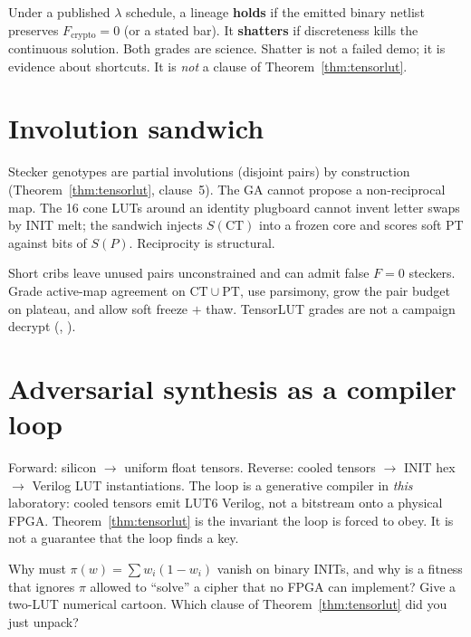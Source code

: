 \begin{definition}[Grade]
Under a published $\lambda$ schedule, a lineage \textbf{holds} if the
emitted binary netlist preserves $F_{\mathrm{crypto}}=0$ (or a stated
bar). It \textbf{shatters} if discreteness kills the continuous solution.
Both grades are science. Shatter is not a failed demo; it is evidence
about shortcuts. It is \emph{not} a clause of Theorem~\ref{thm:tensorlut}.
\end{definition}


\section{Involution sandwich}

Stecker genotypes are partial involutions (disjoint pairs) by construction
(Theorem~\ref{thm:tensorlut}, clause~5).
The GA cannot propose a non-reciprocal map.
The 16 cone LUTs around an identity plugboard cannot invent letter swaps by
INIT melt; the sandwich injects $S(\mathrm{CT})$ into a frozen core and
scores soft PT against bits of $S(P)$.
Reciprocity is structural.

\begin{warning}
Short cribs leave unused pairs unconstrained and can admit false $F=0$
steckers. Grade active-map agreement on $\mathrm{CT}\cup\mathrm{PT}$, use
parsimony, grow the pair budget on plateau, and allow soft freeze $+$ thaw.
TensorLUT grades are not a campaign decrypt (, ).
\end{warning}

\section{Adversarial synthesis as a compiler loop}

Forward: silicon $\to$ uniform float tensors.
Reverse: cooled tensors $\to$ INIT hex $\to$ Verilog LUT instantiations.
The loop is a generative compiler in \emph{this} laboratory: cooled tensors
emit LUT6 Verilog, not a bitstream onto a physical FPGA.
Theorem~\ref{thm:tensorlut} is the invariant the loop is forced to obey.
It is not a guarantee that the loop finds a key.

\begin{exercise}
Why must $\pi(w)=\sum w_i(1-w_i)$ vanish on binary INITs, and why is a
fitness that ignores $\pi$ allowed to ``solve'' a cipher that no FPGA can
implement?
Give a two-LUT numerical cartoon.
Which clause of Theorem~\ref{thm:tensorlut} did you just unpack?
\end{exercise}

